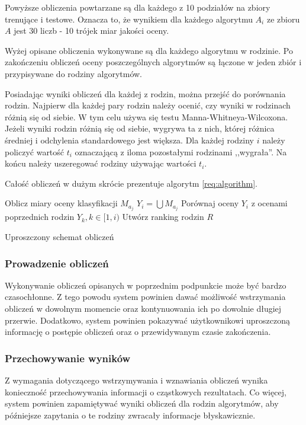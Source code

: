\documentclass[../thesis.tex]{subfiles}
\begin{document}
Powyższe obliczenia powtarzane są dla każdego z 10 podziałów na zbiory trenujące i testowe. Oznacza to, że wynikiem dla każdego algorytmu $A_i$ ze zbioru $A$ jest 30 liczb - 10 trójek miar jakości oceny. 

Wyżej opisane obliczenia wykonywane są dla każdego algorytmu w rodzinie. Po zakończeniu obliczeń oceny poszczególnych algorytmów są łączone w jeden zbiór i przypisywane do rodziny algorytmów.

Posiadając wyniki obliczeń dla każdej z rodzin, można przejść do porównania rodzin. Najpierw dla każdej pary rodzin należy ocenić, czy wyniki w rodzinach różnią się od siebie. W tym celu używa się testu Manna-Whitneya-Wilcoxona. Jeżeli wyniki rodzin różnią się od siebie, wygrywa ta z nich, której różnica średniej i odchylenia standardowego jest większa. Dla każdej rodziny $i$ należy policzyć wartość $t_i$ oznaczającą z iloma pozostałymi rodzinami ,,wygrała''. Na końcu należy uszeregować rodziny używając wartości $t_i$.

Całość obliczeń w dużym skrócie prezentuje algorytm \ref{req:algorithm}.

\begin{algorithm}[ht]
   {
     {
      Oblicz miary oceny klasyfikacji $M_{a_j}$\;
    }
    $Y_i = \bigcup M_{a_j}$\;
    Porównaj oceny $Y_i$ z ocenami poprzednich rodzin $Y_k, k \in [1, i)$\;
  }
  Utwórz ranking rodzin $R$\;
  \caption{Uproszczony schemat obliczeń}
  \label{req:algorithm}
\end{algorithm}

\subsubsection{Prowadzenie obliczeń}

Wykonywanie obliczeń opisanych w poprzednim podpunkcie może być bardzo czasochłonne. Z tego powodu system powinien dawać możliwość wstrzymania obliczeń w dowolnym momencie oraz kontynuowania ich po dowolnie długiej przerwie. Dodatkowo, system powinien pokazywać użytkownikowi uproszczoną informację o postępie obliczeń oraz o przewidywanym czasie zakończenia.

\subsubsection{Przechowywanie wyników}

Z wymagania dotyczącego wstrzymywania i wznawiania obliczeń wynika konieczność przechowywania informacji o cząstkowych rezultatach. Co więcej, system powinien zapamiętywać wyniki obliczeń dla rodzin algorytmów, aby późniejsze zapytania o te rodziny zwracały informacje błyskawicznie.
\end{document}
